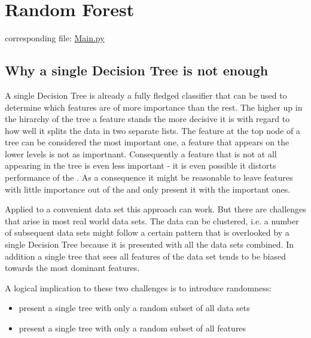 \documentclass[letterpaper,10pt,english]{sphinxmanual}
\begin{document}
\section{Random Forest}
\label{\detokenize{RF:random-forest}}\label{\detokenize{RF::doc}}\label{\detokenize{RF:id1}}
corresponding file: \href{https://github.com/weinertmos/ForestFire/blob/master/source/ForestFire/Main.py}{Main.py}


\subsection{Why a single Decision Tree is not enough}
\label{\detokenize{RF:why-a-single-decision-tree-is-not-enough}}
A single Decision Tree is already a fully fledged classifier that can be used to determine which features are of more importance than the rest.
The higher up in the hirarchy of the tree a feature stands the more decisive it is with regard to how well it splits the data in two separate lists.
The feature at the top node of a tree can be considered the most important one, a feature that appears on the lower levels is not as importnant.
Consequently a feature that is not at all appearing in the tree is even less important - it is even possible it distorts performance of the {\hyperref[\detokenize{Overview:mla}]{}}.
As a consequence it might be reasonable to leave features with little importance out of the {\hyperref[\detokenize{Overview:mla}]{}} and only present it with the important ones.

Applied to a convenient data set this approach can work.
But there are challenges that arise in most real world data sets.
The data can be clustered, i.e. a number of subsequent data sets might follow a certain pattern that is overlooked by a single Decision Tree because it is presented with all the data sets combined.
In addition a single tree that sees all features of the data set tends to be biased towards the most dominant features.

A logical implication to these two challenges is to introduce randomness:
\begin{itemize}
\item {} 
present a single tree with only a random subset of all data sets

\item {} 
present a single tree with only a random subset of all features

\end{itemize}
\end{document}
